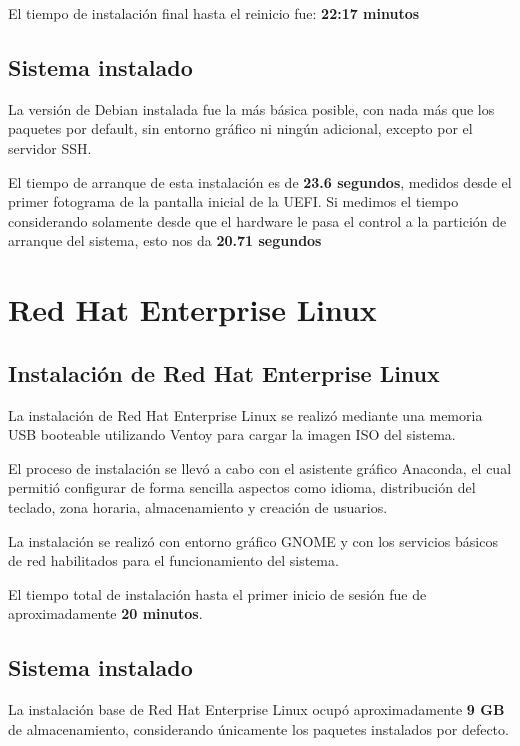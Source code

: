 \documentclass[11pt, letterpaper]{article}
\begin{document}
El tiempo de instalación final hasta el reinicio fue: \textbf{22:17 minutos}
\subsection{Sistema instalado}
\label{sec:org4350345}

La versión de Debian instalada fue la más básica posible, con nada más que los paquetes por default, sin entorno gráfico ni ningún adicional, excepto por el servidor SSH.

El tiempo de arranque de esta instalación es de \textbf{23.6 segundos}, medidos desde el primer fotograma de la pantalla inicial de la UEFI. Si medimos el tiempo considerando solamente desde que el hardware le pasa el control a la partición de arranque del sistema, esto nos da \textbf{20.71 segundos}

\section{Red Hat Enterprise Linux}
\label{sec:org0c08d7e}

\subsection{Instalación de Red Hat Enterprise Linux}

La instalación de Red Hat Enterprise Linux se realizó mediante una memoria USB booteable utilizando Ventoy para cargar la imagen ISO del sistema.

El proceso de instalación se llevó a cabo con el asistente gráfico Anaconda, el cual permitió configurar de forma sencilla aspectos como idioma, distribución del teclado, zona horaria, almacenamiento y creación de usuarios.

La instalación se realizó con entorno gráfico GNOME y con los servicios básicos de red habilitados para el funcionamiento del sistema.

El tiempo total de instalación hasta el primer inicio de sesión fue de aproximadamente \textbf{20 minutos}.

\subsection{Sistema instalado}

La instalación base de Red Hat Enterprise Linux ocupó aproximadamente \textbf{9 GB} de almacenamiento, considerando únicamente los paquetes instalados por defecto.
\end{document}
